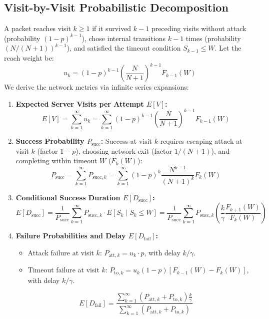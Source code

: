 \documentclass[12pt,onecolumn]{article}
\begin{document}
\subsection{Visit-by-Visit Probabilistic Decomposition}
A packet reaches visit $k \ge 1$ if it survived $k-1$ preceding visits without attack (probability $(1-p)^{k-1}$), chose internal transitions $k-1$ times (probability $(N/(N+1))^{k-1}$), and satisfied the timeout condition $S_{k-1} \le W$. Let the reach weight be:
\begin{equation}
u_k = (1 - p)^{k-1} \left(\frac{N}{N+1}\right)^{k-1} F_{k-1}(W)
\end{equation}
We derive the network metrics via infinite series expansions:
\begin{enumerate}
    \item \textbf{Expected Server Visits per Attempt $E[V]$:}
    \begin{equation}
    E[V] = \sum_{k=1}^\infty u_k = \sum_{k=1}^\infty (1 - p)^{k-1} \left(\frac{N}{N+1}\right)^{k-1} F_{k-1}(W)
    \end{equation}
    \item \textbf{Success Probability $P_{\text{succ}}$:} Success at visit $k$ requires escaping attack at visit $k$ (factor $1-p$), choosing network exit (factor $1/(N+1)$), and completing within timeout $W$ ($F_k(W)$):
    \begin{equation}
    P_{\text{succ}} = \sum_{k=1}^\infty P_{\text{succ}, k} = \sum_{k=1}^\infty (1 - p)^k \frac{N^{k-1}}{(N+1)^k} F_k(W)
    \end{equation}
    \item \textbf{Conditional Success Duration $E[D_{\text{succ}}]$:}
    \begin{equation}
    E[D_{\text{succ}}] = \frac{1}{P_{\text{succ}}} \sum_{k=1}^\infty P_{\text{succ}, k} \cdot E[S_k \mid S_k \le W] = \frac{1}{P_{\text{succ}}} \sum_{k=1}^\infty P_{\text{succ}, k} \left(\frac{k}{\gamma} \frac{F_{k+1}(W)}{F_k(W)}\right)
    \end{equation}
    \item \textbf{Failure Probabilities and Delay $E[D_{\text{fail}}]$:}
    \begin{itemize}
        \item Attack failure at visit $k$: $P_{\text{att}, k} = u_k \cdot p$, with delay $k/\gamma$.
        \item Timeout failure at visit $k$: $P_{\text{to}, k} = u_k (1 - p) [F_{k-1}(W) - F_k(W)]$, with delay $k/\gamma$.
    \end{itemize}
    \begin{equation}
    E[D_{\text{fail}}] = \frac{\sum_{k=1}^\infty (P_{\text{att}, k} + P_{\text{to}, k}) \frac{k}{\gamma}}{\sum_{k=1}^\infty (P_{\text{att}, k} + P_{\text{to}, k})}
    \end{equation}
\end{enumerate}
\end{document}
